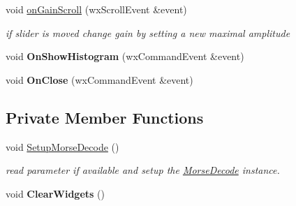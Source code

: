 \begin{DoxyCompactItemize}
void \hyperlink{classMainDialog_a6c56256388bab3fe16995c722a072d33}{on\+Gain\+Scroll} (wx\+Scroll\+Event \&event)
\begin{DoxyCompactList}\small\item\em if slider is moved change gain by setting a new maximal amplitude \end{DoxyCompactList}\item 
\mbox{\label{classMainDialog_afcdc2324728aa4e44b4a8a7e2686cf24}} 
void {\bfseries On\+Show\+Histogram} (wx\+Command\+Event \&event)
\item 
\mbox{\label{classMainDialog_acc02224a5aa1dd5a8db355dcd6d04a8d}} 
void {\bfseries On\+Close} (wx\+Command\+Event \&event)
\end{DoxyCompactItemize}
\subsection*{Private Member Functions}
\begin{DoxyCompactItemize}
\item 
\mbox{\label{classMainDialog_ada04a88fdfc5b3b0921e26f23f7f1fc4}} 
void \hyperlink{classMainDialog_ada04a88fdfc5b3b0921e26f23f7f1fc4}{Setup\+Morse\+Decode} ()
\begin{DoxyCompactList}\small\item\em read parameter if available and setup the \hyperlink{classMorseDecode}{Morse\+Decode} instance. \end{DoxyCompactList}\item 
\mbox{\label{classMainDialog_acd93dbfb870680e4dff510d88f1d3125}} 
void {\bfseries Clear\+Widgets} ()
\end{DoxyCompactItemize}
